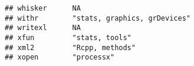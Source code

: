 \documentclass[]{book}
\begin{document}
\begin{verbatim}
## whisker      NA                                                                                                                                                                                                                                                                                                                                                                                                                                                                                                          
## withr        "stats, graphics, grDevices"                                                                                                                                                                                                                                                                                                                                                                                                                                                                                
## writexl      NA                                                                                                                                                                                                                                                                                                                                                                                                                                                                                                          
## xfun         "stats, tools"                                                                                                                                                                                                                                                                                                                                                                                                                                                                                              
## xml2         "Rcpp, methods"                                                                                                                                                                                                                                                                                                                                                                                                                                                                                             
## xopen        "processx"                                                                                                                                                                                                                                                                                                                                                                                                                                                                                                  

\end{verbatim}
\end{document}
